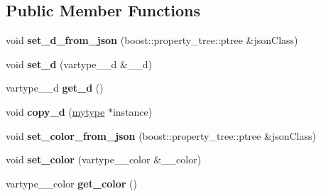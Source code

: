 \subsection*{Public Member Functions}
\begin{DoxyCompactItemize}
\item 
\mbox{\label{classfilter_1_1algos_1_1_bilateral_filter_aa963e245a6fb9b4f9db2b1b245c3f221}} 
void {\bfseries set\+\_\+d\+\_\+from\+\_\+json} (boost\+::property\+\_\+tree\+::ptree \&json\+Class)
\item 
\mbox{\label{classfilter_1_1algos_1_1_bilateral_filter_a0009dbe0037c3b61dd2306cbedd20d11}} 
void {\bfseries set\+\_\+d} (vartype\+\_\+\+\_\+d \&\+\_\+\+\_\+d)
\item 
\mbox{\label{classfilter_1_1algos_1_1_bilateral_filter_ae3a262210f23e2c7fe44974da55f1e17}} 
vartype\+\_\+\+\_\+d {\bfseries get\+\_\+d} ()
\item 
\mbox{\label{classfilter_1_1algos_1_1_bilateral_filter_a75c966ec263ff507695658afeb96713c}} 
void {\bfseries copy\+\_\+d} (\hyperlink{classfilter_1_1algos_1_1_bilateral_filter}{mytype} $\ast$instance)
\item 
\mbox{\label{classfilter_1_1algos_1_1_bilateral_filter_ae971dbc3cb5d874f2e84ea33390d7871}} 
void {\bfseries set\+\_\+color\+\_\+from\+\_\+json} (boost\+::property\+\_\+tree\+::ptree \&json\+Class)
\item 
\mbox{\label{classfilter_1_1algos_1_1_bilateral_filter_a596c9c41882d5301034c66cae19afc2f}} 
void {\bfseries set\+\_\+color} (vartype\+\_\+\+\_\+color \&\+\_\+\+\_\+color)
\item 
\mbox{\label{classfilter_1_1algos_1_1_bilateral_filter_a3a6b37a3468e8b03e1ed7db7a2343e34}} 
vartype\+\_\+\+\_\+color {\bfseries get\+\_\+color} ()
\item 
\mbox{\label{classfilter_1_1algos_1_1_bilateral_filter_aafb408f784239f15ef9ca5fcc774e886}} 

\end{DoxyCompactItemize}
